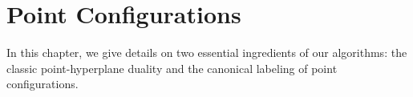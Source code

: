 \chapter{\done Point Configurations}%
\label{chaper:point-configurations}

In this chapter,
we give details on two essential ingredients of our algorithms:
the classic point-hyperplane duality
and
the canonical labeling of point configurations.





